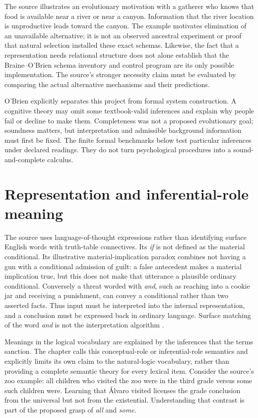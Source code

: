 The source illustrates an evolutionary motivation with a gatherer who
knows that food is available near a river or near a canyon. Information
that the river location is unproductive leads toward the canyon. The
example motivates elimination of an unavailable alternative; it is not
an observed ancestral experiment or proof that natural selection installed
these exact schemas. Likewise, the fact that a representation needs
relational structure does not alone establish that the Braine--O'Brien
schema inventory and control program are its only possible implementation.
The source's stronger necessity claim must be evaluated by comparing
the actual alternative mechanisms and their predictions.

O'Brien explicitly separates this project from formal system construction.
A cognitive theory may omit some textbook-valid inferences and explain
why people fail or decline to make them. Completeness was not a proposed
evolutionary goal; soundness matters, but interpretation and admissible
background information must first be fixed. The finite formal benchmarks
below test particular inferences under declared readings. They do not
turn psychological procedures into a sound-and-complete calculus.

\section{Representation and inferential-role meaning}
\label{sec:p19-r32-representation}

The source uses language-of-thought expressions rather than identifying
surface English words with truth-table connectives. Its \emph{if} is not
defined as the material conditional. Its illustrative material-implication
paradox combines not having a gun with a conditional admission of guilt:
a false antecedent makes a material implication true, but this does not
make that utterance a plausible ordinary conditional. Conversely a threat
worded with \emph{and}, such as reaching into a cookie jar and receiving
a punishment, can convey a conditional rather than two asserted facts.
Thus input must be interpreted into the internal representation, and a
conclusion must be expressed back in ordinary language. Surface matching
of the word \emph{and} is not the interpretation algorithm
\cite[pp.~216--217]{OBrien2021NaturalLogic}.

Meanings in the logical vocabulary are explained by the inferences that
the terms sanction. The chapter calls this conceptual-role or
inferential-role semantics and explicitly limits its own claim to the
natural-logic vocabulary, rather than providing a complete semantic theory
for every lexical item. Consider the source's zoo example: all children
who visited the zoo were in the third grade versus some such children
were. Learning that Álvaro visited licenses the grade conclusion from
the universal but not from the existential. Understanding that contrast
is part of the proposed grasp of \emph{all} and \emph{some}.

